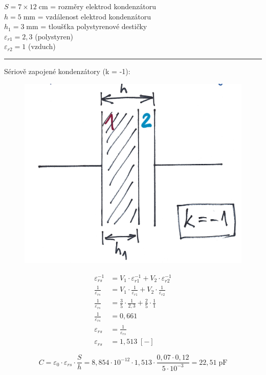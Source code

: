 %
%

$S = 7 \times 12 \; \si{\centi\meter}$ = rozměry elektrod kondenzátoru\\
$h = 5 \; \si{\milli\meter}$ = vzdálenost elektrod kondenzátoru\\
$h_1 = 3 \; \si{\milli\meter}$ = tloušťka polystyrenové destičky\\
$\varepsilon_{r1} = 2,3$ (polystyren)\\
$\varepsilon_{r2} = 1$ (vzduch)\\
\noindent\rule{8cm}{0.4pt}

Sériově zapojené kondenzátory (k = -1):

\begin{figure}[h]
    \centering
    \includegraphics[width=.2\textwidth]{images/ul3_C1.jpg}
\end{figure}

\begin{align*}
    \varepsilon_{rs}^{-1} &= V_1 \cdot \varepsilon_{r1}^{-1} + V_2 \cdot \varepsilon_{r2}^{-1} \\
    \frac{1}{\varepsilon_{rs}} &= V_1 \cdot \frac{1}{\varepsilon_{r1}} + V_2 \cdot \frac{1}{\varepsilon_{r2}} \\
    \frac{1}{\varepsilon_{rs}} &= \frac{3}{5} \cdot \frac{1}{2,3} + \frac{2}{5} \cdot \frac{1}{1} \\
    \frac{1}{\varepsilon_{rs}} &= 0,661 \\
    \varepsilon_{rs} &= \frac{1}{\varepsilon_{rs}} \\
    \varepsilon_{rs} &= 1,513 \; [-]
\end{align*}

\begin{equation*}
    C = \varepsilon_0 \cdot \varepsilon_{rs} \cdot \frac{S}{h} = 8,854 \cdot 10^{-12} \cdot 1,513 \cdot \frac{0,07 \cdot 0,12}{5 \cdot 10^{-3}} = 22,51 \; \si{\pico\farad}
\end{equation*}

